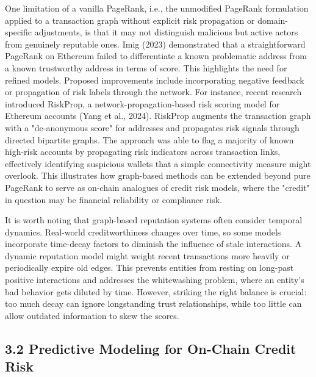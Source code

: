 One limitation of a vanilla PageRank, i.e., the unmodified PageRank formulation applied to a transaction graph without explicit risk propagation or domain-specific adjustments, is that it may not distinguish malicious but active actors from genuinely reputable ones. Imig (2023) demonstrated that a straightforward PageRank on Ethereum failed to differentiate a known problematic address from a known trustworthy address in terms of score. This highlights the need for refined models. Proposed improvements include incorporating negative feedback or propagation of risk labels through the network. For instance, recent research introduced RiskProp, a network-propagation-based risk scoring model for Ethereum accounts (Yang et al., 2024). RiskProp augments the transaction graph with a "de-anonymous score" for addresses and propagates risk signals through directed bipartite graphs. The approach was able to flag a majority of known high-risk accounts by propagating risk indicators across transaction links, effectively identifying suspicious wallets that a simple connectivity measure might overlook. This illustrates how graph-based methods can be extended beyond pure PageRank to serve as on-chain analogues of credit risk models, where the "credit" in question may be financial reliability or compliance risk.


It is worth noting that graph-based reputation systems often consider temporal dynamics. Real-world creditworthiness changes over time, so some models incorporate time-decay factors to diminish the influence of stale interactions. A dynamic reputation model might weight recent transactions more heavily or periodically expire old edges. This prevents entities from resting on long-past positive interactions and addresses the whitewashing problem, where an entity's bad behavior gets diluted by time. However, striking the right balance is crucial: too much decay can ignore longstanding trust relationships, while too little can allow outdated information to skew the scores.


\subsection*{3.2 Predictive Modeling for On-Chain Credit Risk}
\label{sec:predictive-modeling-for-on-chain-credit-risk}

